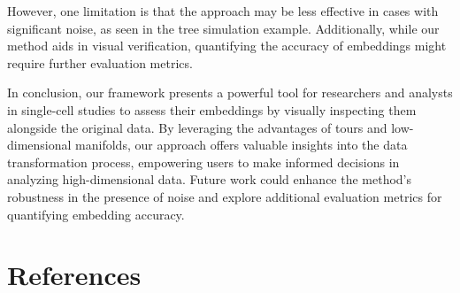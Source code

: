 \documentclass[
  12pt]{article}
\begin{document}
However, one limitation is that the approach may be less effective in
cases with significant noise, as seen in the tree simulation example.
Additionally, while our method aids in visual verification, quantifying
the accuracy of embeddings might require further evaluation metrics.

In conclusion, our framework presents a powerful tool for researchers
and analysts in single-cell studies to assess their embeddings by
visually inspecting them alongside the original data. By leveraging the
advantages of tours and low-dimensional manifolds, our approach offers
valuable insights into the data transformation process, empowering users
to make informed decisions in analyzing high-dimensional data. Future
work could enhance the method's robustness in the presence of noise and
explore additional evaluation metrics for quantifying embedding
accuracy.

\hypertarget{references}{%
\section*{References}\label{references}}

\renewcommand{\bibsection}{}


\newpage{}
\end{document}
